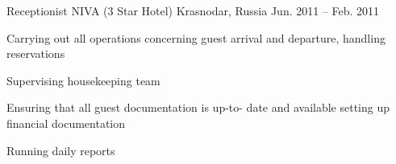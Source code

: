 \begin{cventries}
  \cventry
    {Receptionist} %
    {NIVA (3 Star Hotel)} %
    {Krasnodar, Russia} %
    {Jun. 2011 -- Feb. 2011} %
    {
      \begin{cvitems} %
        \item {Carrying out all operations concerning guest arrival and departure, handling reservations}
        \item {Supervising housekeeping team}
        \item {Ensuring that all guest documentation is up-to- date and available setting up financial documentation}
        \item {Running daily reports}
      \end{cvitems}
    }

\end{cventries}
